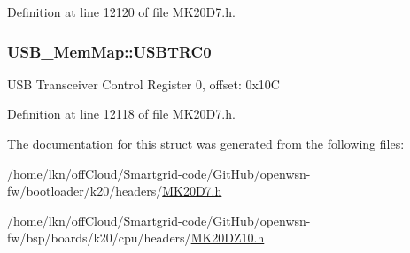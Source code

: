 Definition at line 12120 of file M\+K20\+D7.\+h.

\subsubsection[{\texorpdfstring{U\+S\+B\+T\+R\+C0}{USBTRC0}}]{ U\+S\+B\+\_\+\+Mem\+Map\+::\+U\+S\+B\+T\+R\+C0}\hypertarget{struct_u_s_b___mem_map_a10d494a848ee49ff264d62eb0bfb439e}{}\label{struct_u_s_b___mem_map_a10d494a848ee49ff264d62eb0bfb439e}
U\+SB Transceiver Control Register 0, offset\+: 0x10C 

Definition at line 12118 of file M\+K20\+D7.\+h.



The documentation for this struct was generated from the following files\+:\begin{DoxyCompactItemize}
\item 
/home/lkn/off\+Cloud/\+Smartgrid-\/code/\+Git\+Hub/openwsn-\/fw/bootloader/k20/headers/\hyperlink{bootloader_2k20_2headers_2_m_k20_d7_8h}{M\+K20\+D7.\+h}\item 
/home/lkn/off\+Cloud/\+Smartgrid-\/code/\+Git\+Hub/openwsn-\/fw/bsp/boards/k20/cpu/headers/\hyperlink{_m_k20_d_z10_8h}{M\+K20\+D\+Z10.\+h}\end{DoxyCompactItemize}
